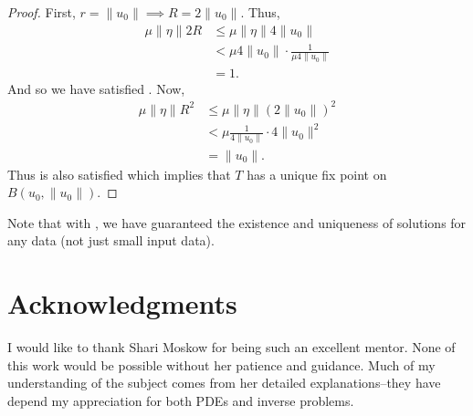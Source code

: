 \documentclass[a4paper, 12pt]{article}
\begin{document}
\begin{proof}
	First, $r = \lVert u_0 \rVert\implies R = 2\lVert u_0 \rVert$.
	Thus,
	\begin{align*}
		\mu\lVert \eta \rVert 2R &\le \mu \lVert \eta \rVert 4 \lVert u_0 \rVert\\
	&< \mu 4 \lVert u_0 \rVert\cdot \frac{1}{\mu 4 \lVert u_0 \rVert}\\
	&= 1
	.\end{align*}
	And so we have satisfied .
	Now,
	\begin{align*}
	\mu \lVert \eta \rVert R^2 &\le \mu \lVert \eta \rVert \left( 2\lVert u_0 \rVert \right)^2\\
	&< \mu \frac{1}{4 \lVert u_0 \rVert}\cdot 4 \lVert u_0 \rVert^2\\
	 &= \lVert u_0 \rVert
	.\end{align*}
	Thus  is also satisfied which implies that $T$ has a unique fix point on $B\left( u_0, \lVert u_0 \rVert \right)$.
\end{proof}

\begin{rem}
	Note that with , we have guaranteed the existence and uniqueness of solutions for any data (not just small input data).
\end{rem}

\section{Acknowledgments}
I would like to thank Shari Moskow for being such an excellent mentor. None of this work would be possible without her patience and guidance.
Much of my understanding of the subject comes from her detailed explanations--they have depend my appreciation for both PDEs and inverse problems.

\printbibliography
\end{document}
